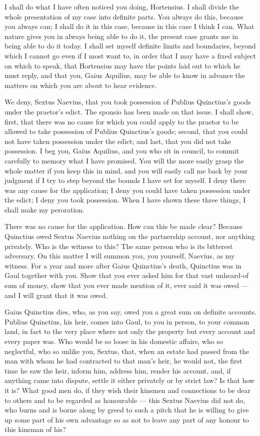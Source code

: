  I shall do what I have often noticed you doing, Hortensius. I shall divide the whole presentation of my case into definite parts. You always do this, because you always can; I shall do it in this case, because in this case I think I can. What nature gives you in always being able to do it, the present case grants me in being able to do it today. I shall set myself definite limits and boundaries, beyond which I cannot go even if I most want to, in order that I may have a fixed subject on which to speak, that Hortensius may have the points laid out to which he must reply, and that you, Gaius Aquilius, may be able to know in advance the matters on which you are about to hear evidence.

 We deny, Sextus Naevius, that you took possession of Publius Quinctius's goods under the praetor's edict. The sponsio has been made on that issue. I shall show, first, that there was no cause for which you could apply to the praetor to be allowed to take possession of Publius Quinctius's goods; second, that you could not have taken possession under the edict; and last, that you did not take possession. I beg you, Gaius Aquilius, and you who sit in council, to commit carefully to memory what I have promised. You will the more easily grasp the whole matter if you keep this in mind, and you will easily call me back by your judgment if I try to step beyond the bounds I have set for myself. I deny there was any cause for the application; I deny you could have taken possession under the edict; I deny you took possession. When I have shown these three things, I shall make my peroration.

 There was no cause for the application. How can this be made clear? Because Quinctius owed Sextus Naevius nothing on the partnership account, nor anything privately. Who is the witness to this? The same person who is its bitterest adversary. On this matter I will summon you, you yourself, Naevius, as my witness. For a year and more after Gaius Quinctius's death, Quinctius was in Gaul together with you. Show that you ever asked him for that vast unheard-of sum of money, show that you ever made mention of it, ever said it was owed --- and I will grant that it was owed.

 Gaius Quinctius dies, who, as you say, owed you a great sum on definite accounts. Publius Quinctius, his heir, comes into Gaul, to you in person, to your common land, in fact to the very place where not only the property but every account and every paper was. Who would be so loose in his domestic affairs, who so neglectful, who so unlike you, Sextus, that, when an estate had passed from the man with whom he had contracted to that man's heir, he would not, the first time he saw the heir, inform him, address him, render his account, and, if anything came into dispute, settle it either privately or by strict law? Is that how it is? What good men do, if they wish their kinsmen and connections to be dear to others and to be regarded as honourable --- this Sextus Naevius did not do, who burns and is borne along by greed to such a pitch that he is willing to give up some part of his own advantage so as not to leave any part of any honour to this kinsman of his?

